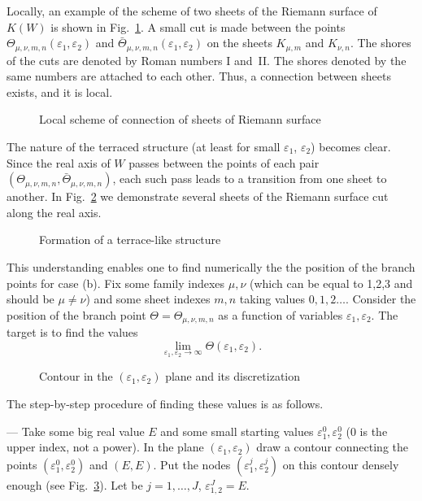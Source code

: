 \documentclass[12pt]{article}
\newcommand{\eps}{\varepsilon}
\begin{document}
Locally, an example of the scheme of two sheets of the Riemann surface of $K(W)$ is shown in 
Fig.~\ref{fig10}. 
A small cut is made between the points $\Theta_{\mu,\nu , m,n} (\eps_1 , \eps_2)$
and $\bar \Theta_{\mu, \nu , m,n} (\eps_1 , \eps_2)$ on the sheets 
$K_{\mu, m}$  and $K_{\nu , n}$. The shores of the cuts are denoted by Roman numbers I and~II.
The shores denoted by the same numbers are attached to each other.    
Thus, a connection between sheets exists, and it is local.                   
        
\begin{figure}[ht]
\centerline{}
\caption{Local scheme of connection of sheets of Riemann surface} 
\label{fig10}
\end{figure}

The nature of the terraced structure (at least for small $\eps_1$, $\eps_2$) becomes
clear. Since the real axis of $W$ passes between the points of each pair 
$(\Theta_{\mu,\nu,m,n}, \bar \Theta_{\mu,\nu,m,n})$,
each such pass leads to a transition from one sheet to another.  
In Fig.~\ref{fig11} we demonstrate several sheets of the Riemann surface cut along the real axis.
 
\begin{figure}[ht]
\centerline{}
\caption{Formation of a terrace-like structure} 
\label{fig11}
\end{figure}

This understanding enables one to find numerically the the position of the 
branch points for case (b). Fix some family indexes $\mu,\nu$
(which can be equal to 1,2,3 and should be $\mu \ne \nu$) and some sheet indexes $m,n$
taking values $0,1,2\dots$. Consider the position of the branch point 
$\Theta = \Theta_{\mu,\nu, m, n}$ as a function of variables $\eps_1 , \eps_2$.
The target is to find the values 
\[
\lim_{\eps_1, \eps_2 \to \infty} \Theta (\eps_1 , \eps_2).
\]

\begin{figure}[ht]
\centerline{}
\caption{Contour in the $(\eps_1 , \eps_2)$ plane and its discretization} 
\label{fig16}
\end{figure}

The step-by-step procedure of finding 
these values is as follows. 

\noindent
--- Take some big real value $E$ and some small starting values $\eps_1^0 , \eps_2^0$
(0 is the upper index, not a power).
In the plane $(\eps_1 , \eps_2)$ draw a contour 
connecting the points $(\eps_1^0 , \eps_2^0)$ and $(E,E)$.
Put the nodes $(\eps_1^j , \eps_2^j)$ on this contour densely enough (see 
Fig.~\ref{fig16}). Let be 
$j= 1,\dots , J$, $\eps_{1,2}^J = E$. 
\end{document}
